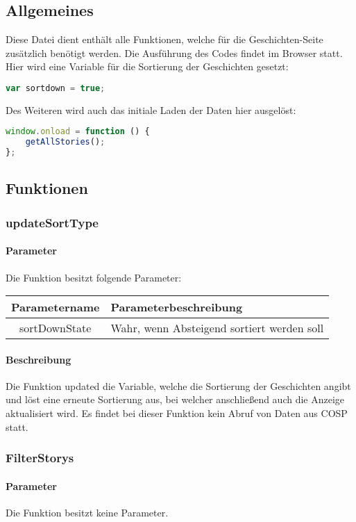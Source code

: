 \subsection{Allgemeines} Diese Datei dient enthält alle Funktionen, welche für die Geschichten-Seite zusätzlich benötigt werden.
Die Ausführung des Codes findet im Browser statt. Hier wird eine Variable für die Sortierung der Geschichten gesetzt:
\begin{lstlisting}[language=JavaScript]
var sortdown = true;
\end{lstlisting} 
Des Weiteren wird auch das initiale Laden der Daten hier ausgelöst:
\begin{lstlisting}[language=JavaScript]
window.onload = function () {
	getAllStories();
};
\end{lstlisting} 
\newpage
\subsection{Funktionen}
\subsubsection{updateSortType}
\paragraph{Parameter} Die Funktion besitzt folgende Parameter:
\begin{table}[H]
	\begin{tabular}{|c|p{11cm}|}
		\hline
		\textbf{Parametername} & \textbf{Parameterbeschreibung} \\ \hline
		sortDownState & Wahr, wenn Absteigend sortiert werden soll \\ \hline
	\end{tabular}
\end{table}
\paragraph{Beschreibung} Die Funktion updated die Variable, welche die Sortierung der Geschichten angibt und löst eine erneute Sortierung aus, bei welcher anschließend auch die Anzeige aktualisiert wird. Es findet bei dieser Funktion kein Abruf von Daten aus {\glqq COSP\grqq} statt.
\subsubsection{FilterStorys}
\paragraph{Parameter} Die Funktion besitzt keine Parameter.
